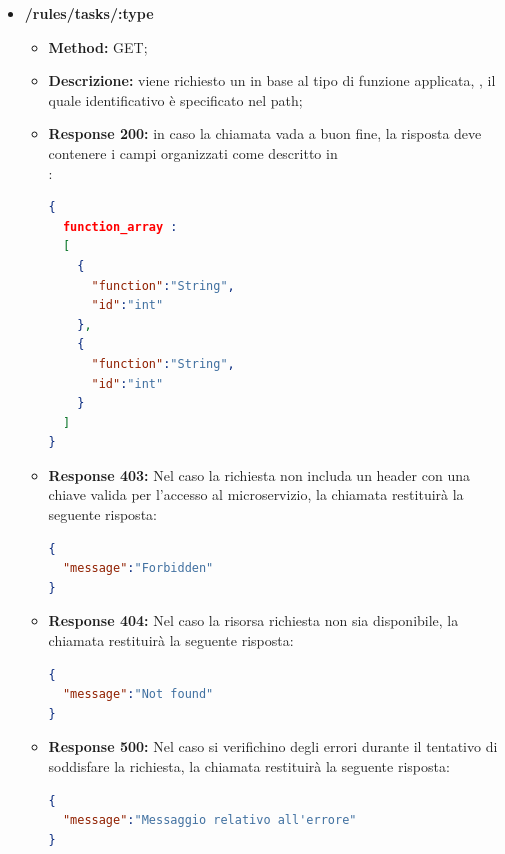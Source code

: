 \begin{itemize}
\item \textbf{/rules/tasks/:type}\\

\begin{itemize}
\item \textbf{Method:} GET;
\item \textbf{Descrizione:} viene richiesto un  in base al tipo di funzione applicata, , il quale identificativo è specificato nel path;

\item \textbf{Response 200:} in caso la chiamata vada a buon fine, la risposta deve contenere i campi organizzati come descritto in \\:
\begin{lstlisting}[language=json,firstnumber=1]
{
  function_array :
  [
    {
      "function":"String",
      "id":"int"
    },
    {
      "function":"String",
      "id":"int"
    }
  ]
}
\end{lstlisting}
\item \textbf{Response 403:} Nel caso la richiesta non includa un header  con una chiave valida per l'accesso al microservizio, la chiamata restituirà la seguente risposta:
\begin{lstlisting}[language=json,firstnumber=1]
{
  "message":"Forbidden"
}
\end{lstlisting}

\item \textbf{Response 404:} Nel caso la risorsa richiesta non sia disponibile, la chiamata restituirà la seguente risposta:
\begin{lstlisting}[language=json,firstnumber=1]
{
  "message":"Not found"
}
\end{lstlisting}
\item \textbf{Response 500:} Nel caso si verifichino degli errori durante il tentativo di soddisfare la richiesta, la chiamata restituirà la seguente risposta:
\begin{lstlisting}[language=json,firstnumber=1]
{
  "message":"Messaggio relativo all'errore"
}
\end{lstlisting}
\end{itemize}


\end{itemize}
